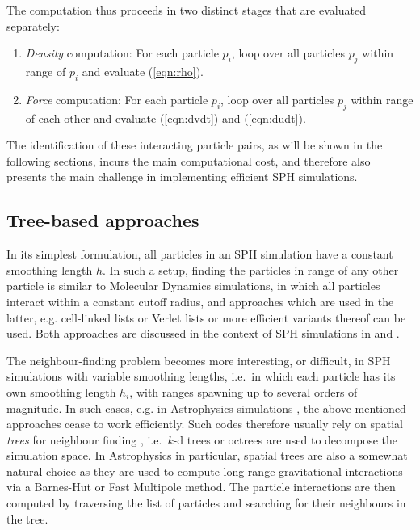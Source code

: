 \documentclass{sig-alternate-05-2015}
\newcommand{\eqn}[1] {(\ref{eqn:#1})}
\begin{document}
The computation thus proceeds in two distinct stages that are evaluated
separately:
\begin{enumerate}
    \item {\em Density} computation: For each particle $p_i$,
        loop over all particles $p_j$ within range of $p_i$ and evaluate
        \eqn{rho}.
    \item {\em Force} computation: For each particle $p_i$,
        loop over all particles $p_j$
        within range of each other and evaluate \eqn{dvdt} and \eqn{dudt}.
\end{enumerate}
The identification of these interacting particle pairs,
as will be shown in the following sections, incurs the main computational
cost, and therefore also presents the main challenge in implementing efficient
SPH simulations.


\subsection{Tree-based approaches}

In its simplest formulation, all particles in an SPH simulation have
a constant smoothing length $h$.
In such a setup, finding the particles in range of any other particle
is similar to Molecular Dynamics simulations, in which all particles
interact within a constant cutoff radius, and approaches which are used
in the latter, e.g. cell-linked lists
\cite{Allen1989} or Verlet lists \cite{Verlet1967}
or more efficient variants thereof \cite{Gonnet2012,Gonnet2013}
can be used.
Both approaches are discussed in the context of SPH simulations
in \cite{Dominguez2011} and \cite{Viccione2008}.

The neighbour-finding problem becomes more interesting, or difficult,
in SPH simulations with variable smoothing lengths, i.e.~in which
each particle has its own smoothing length $h_i$, with ranges spawning
up to several orders of magnitude.
In such cases, e.g. in Astrophysics simulations \cite{Gingold1977},
the above-mentioned approaches cease to work efficiently.
Such codes therefore usually rely on spatial {\em trees}
for neighbour finding \cite{Hernquist1989,Springel2005,Wadsley2004},
i.e.~$k$-d trees \cite{Bentley1975} or octrees \cite{Meagher1982}
are used to decompose the simulation space.
In Astrophysics in particular, spatial trees are also a somewhat natural
choice as they are used to compute long-range gravitational interactions
via a Barnes-Hut \cite{Barnes1986} or Fast Multipole
\cite{Carrier1988} method. 
The particle interactions are then computed by traversing the list of
particles and searching for their neighbours in the tree.
\end{document}
